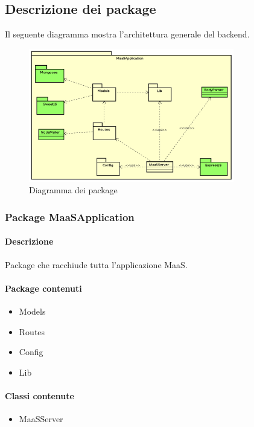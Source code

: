 \subsection{Descrizione dei package}
Il seguente diagramma mostra l'architettura generale del backend.
\begin{figure}[H]
\centering
\includegraphics[width=0.8\textwidth]{res/sections/backend/generale.png}
\caption{Diagramma dei package}
\end{figure}

\subsubsection{Package MaaSApplication}
\paragraph*{Descrizione}
Package che racchiude tutta l'applicazione MaaS.

\paragraph*{Package contenuti}
\begin{itemize}
\item Models
\item Routes
\item Config
\item Lib
\end{itemize}

\paragraph*{Classi contenute}
\begin{itemize}
\item MaaSServer
\end{itemize}

